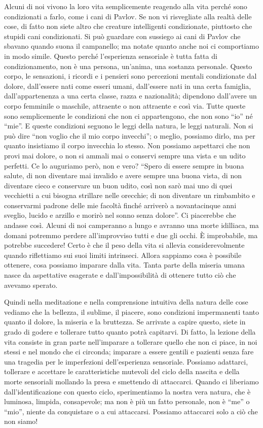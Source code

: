 Alcuni di noi vivono la loro vita semplicemente reagendo alla vita
perché sono condizionati a farlo, come i cani di Pavlov. Se non vi
risvegliate alla realtà delle cose, di fatto non siete altro che
creature intelligenti condizionate, piuttosto che stupidi cani
condizionati. Si può guardare con sussiego ai cani di Pavlov che sbavano
quando suona il campanello; ma notate quanto anche noi ci comportiamo in
modo simile. Questo perché l'esperienza sensoriale è tutta fatta di
condizionamento, non è una persona, un'anima, una sostanza personale.
Questo corpo, le sensazioni, i ricordi e i pensieri sono percezioni
mentali condizionate dal dolore, dall'essere nati come esseri umani,
dall'essere nati in una certa famiglia, dall'appartenenza a una certa
classe, razza e nazionalità; dipendono dall'avere un corpo femminile o
maschile, attraente o non attraente e così via. Tutte queste sono
semplicemente le condizioni che non ci appartengono, che non sono ``io''
né ``mie''. E queste condizioni seguono le leggi della natura, le leggi
naturali. Non si può dire ``non voglio che il mio corpo invecchi''; o
meglio, possiamo dirlo, ma per quanto insistiamo il corpo invecchia lo
stesso. Non possiamo aspettarci che non provi mai dolore, o non si
ammali mai o conservi sempre una vista e un udito perfetti. Ce lo
auguriamo però, non e vero? ``Spero di essere sempre in buona salute, di
non diventare mai invalido e avere sempre una buona vista, di non
diventare cieco e conservare un buon udito, così non sarò mai uno di
quei vecchietti a cui bisogna strillare nelle orecchie; di non diventare
un rimbambito e conservarmi padrone delle mie facoltà finché arriverò a
novantacinque anni sveglio, lucido e arzillo e morirò nel sonno senza
dolore''. Ci piacerebbe che andasse così. Alcuni di noi camperanno a
lungo e avranno una morte idilliaca, ma domani potremmo perdere
all'improvviso tutti e due gli occhi. È improbabile, ma potrebbe
succedere! Certo è che il peso della vita si allevia considerevolmente
quando riflettiamo sui suoi limiti intrinseci. Allora sappiamo cosa è
possibile ottenere, cosa possiamo imparare dalla vita. Tanta parte della
miseria umana nasce da aspettative esagerate e dall'impossibilità di
ottenere tutto ciò che avevamo sperato.

Quindi nella meditazione e nella comprensione intuitiva della natura
delle cose vediamo che la bellezza, il sublime, il piacere, sono
condizioni impermanenti tanto quanto il dolore, la miseria e la
bruttezza. Se arrivate a capire questo, siete in grado di godere e
tollerare tutto quanto potrà capitarvi. Di fatto, la lezione della vita
consiste in gran parte nell'imparare a tollerare quello che non ci
piace, in noi stessi e nel mondo che ci circonda; imparare a essere
gentili e pazienti senza fare una tragedia per le imperfezioni
dell'esperienza sensoriale. Possiamo adattarci, tollerare e accettare le
caratteristiche mutevoli del ciclo della nascita e della morte
sensoriali mollando la presa e smettendo di attaccarci. Quando ci
liberiamo dall'identificazione con questo ciclo, sperimentiamo la nostra
vera natura, che è luminosa, limpida, consapevole; ma non è più un fatto
personale, non è ``me'' o ``mio'', niente da conquistare o a cui attaccarsi.
Possiamo attaccarci solo a ciò che non siamo!

